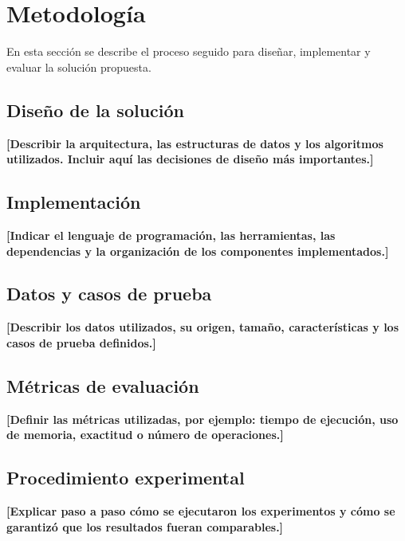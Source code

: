 \section{Metodología}
\label{sec:metodologia}

En esta sección se describe el proceso seguido para diseñar, implementar y
evaluar la solución propuesta.

\subsection{Diseño de la solución}

\textbf{[Describir la arquitectura, las estructuras de datos y los algoritmos
utilizados. Incluir aquí las decisiones de diseño más importantes.]}

\subsection{Implementación}

\textbf{[Indicar el lenguaje de programación, las herramientas, las
dependencias y la organización de los componentes implementados.]}

\subsection{Datos y casos de prueba}

\textbf{[Describir los datos utilizados, su origen, tamaño, características y
los casos de prueba definidos.]}

\subsection{Métricas de evaluación}

\textbf{[Definir las métricas utilizadas, por ejemplo: tiempo de ejecución,
uso de memoria, exactitud o número de operaciones.]}

\subsection{Procedimiento experimental}

\textbf{[Explicar paso a paso cómo se ejecutaron los experimentos y cómo se
garantizó que los resultados fueran comparables.]}
